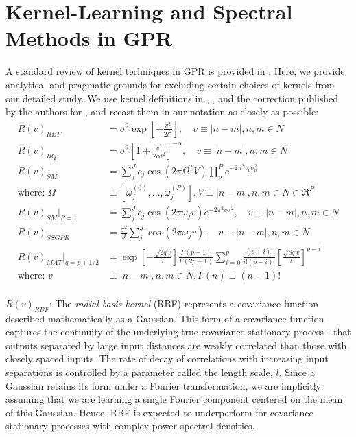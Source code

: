 \section{Kernel-Learning and Spectral Methods in GPR} \label{sec:ap_gpr_kernels}

A standard review of kernel techniques in GPR is provided in \cite{rasmussen2006gaussian}. Here, we provide analytical and pragmatic grounds for excluding certain choices of kernels from our detailed study. We use kernel definitions in \cite{rasmussen2006gaussian}, \cite{wilson2013gaussian}, and the correction published by the authors for \cite{wilson2013gaussian}, and recast them in our notation as closely as possible:
\\
\begin{align} 
R(v)_{RBF} & = \sigma^2 \exp \left[ -\frac{v^2}{2l^2} \right], \quad v \equiv |n-m|, n, m \in N  \label{eqn:ap_gpr_kernels:RBF_} \\
R(v)_{RQ} & = \sigma^2 \left[1 + \frac{v^2}{2 \alpha l^2}\right]^{-\alpha} , \quad v \equiv |n-m|, n, m \in N  \label{eqn:ap_gpr_kernels:RQ} \\
R(v)_{SM} & = \sum_j^J c_j \cos (2 \pi \Omega^T V) \prod_p^P e^{-2\pi^2 v_p \sigma_p^2} \\
\text{where: } \Omega & \equiv [\omega_j^{(0)}, ..., \omega_j^{(P)}], V \equiv |n-m|, n, m \in N \in \Re^P \label{eqn:ap_gpr_kernels:SM} \\
R(v)_{SM}|_{P=1} & = \sum_j^J c_j \cos (2 \pi \omega_j v) e^{-2\pi^2 v \sigma^2}, \quad v \equiv |n-m|, n, m \in N \label{eqn:ap_gpr_kernels:SM_univariate} \\
R(v)_{SSGPR} & = \frac{\sigma^2}{J} \sum_j^{J} \cos(2\pi\omega_j v), \quad v \equiv |n-m|, n, m \in N \label{eqn:ap_gpr_kernels:SSPG} \\
R(v)_{MAT}|_{q = p + 1/2} & =  \exp \left[   -\frac{\sqrt{2q} v}{l} \right]  
\frac{\Gamma(p+1)}{\Gamma(2p+1)} 
\sum_{i=0}^{p} \frac{(p+i)!}{i!(p-i)!}\left[ \frac{\sqrt{8q}v}{l}\right]^{p-i}  \label{eqn:ap_gpr_kernels:MAT_}\\
\text{where: }  v & \equiv |n-m|, n, m \in N, \Gamma(n) \equiv (n-1)!
\end{align}
\\
\textbf{$R(v)_{RBF}$}: The \textit{radial basis kernel} (RBF) represents a covariance function described mathematically as a Gaussian. This form of a covariance function captures the continuity of the underlying true covariance stationary process - that outputs separated by large input distances are weakly correlated than those with closely spaced inputs. The rate of decay of correlations with increasing input separations is controlled by a parameter called the length scale, $l$. Since a Gaussian retains its form under a Fourier transformation, we are implicitly assuming that we are learning a single Fourier component centered on the mean of this Gaussian. Hence,  RBF is expected to underperform for covariance stationary processes with complex power spectral densities. 
